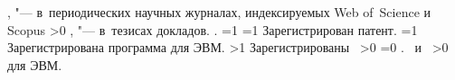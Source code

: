 {\begin{refsection}
			,  "--- в~периодических научных журналах, индексируемых Web of~Science и Scopus%
		\fi%
		\ifnum \value{citeauthorconf}>0%
			,  "--- в~тезисах докладов.
		\else%
			.
		\fi%
		\ifnum \value{citeregistered}=1%
			\ifnum \value{citeauthorpatent}=1%
				Зарегистрирован  патент.
			\fi%
			\ifnum \value{citeauthorprogram}=1%
				Зарегистрирована  программа для ЭВМ.
			\fi%
		\fi%
		\ifnum \value{citeregistered}>1%
			Зарегистрированы\ %
			\ifnum \value{citeauthorpatent}>0%
				\ifnum \value{citeauthorprogram}=0 . \else \ и~\fi%
			\fi%
			\ifnum \value{citeauthorprogram}>0%
				 для ЭВМ.
			\fi%
		\fi%
	\end{refsection}%
	\begin{refsection}
		\nocite{patbib1}%
		\nocite{pub3}
		\nocite{pub4}
		\nocite{pub6}
		\nocite{pub8}
		\nocite{pub13}
		\nocite{pub14}
		\nocite{pub16}
		\nocite{pub19}
		\nocite{pub21}
		\nocite{pub22}
	\end{refsection}%
}
